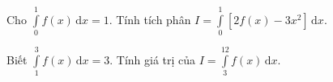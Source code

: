 \begin{ex}%
	Cho $\displaystyle\int\limits_0^1f(x)\mathrm{\,d}x=1$. Tính tích phân $ I=\displaystyle\int\limits_0^1\left[2f(x)-3x^2\right]\mathrm{\,d}x.$\\
\end{ex}

\begin{ex}%
	Biết $\displaystyle\int\limits_1^3f(x)\mathrm{\,d}x=3$. Tính giá trị của $ I=\displaystyle\int\limits_3^12f(x)\mathrm{\,d}x$.\\
\end{ex}




